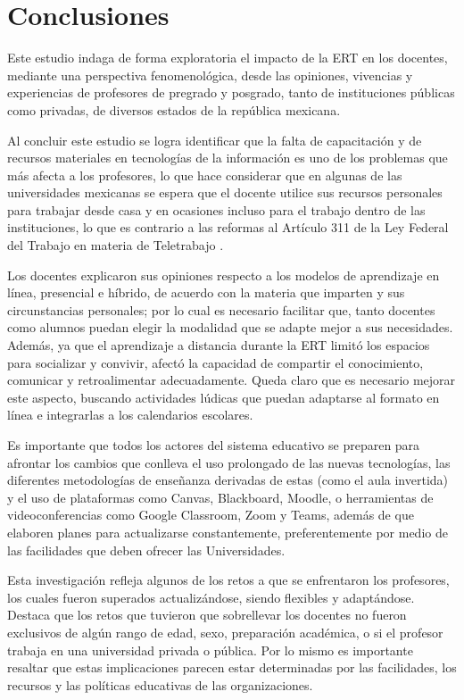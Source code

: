 \documentclass[spanish]{textolivre}
\begin{document}
\section{Conclusiones}

Este estudio indaga de forma exploratoria el impacto de la ERT en los docentes, mediante una perspectiva fenomenológica, desde las opiniones, vivencias y experiencias de profesores de pregrado y posgrado, tanto de instituciones públicas como privadas, de diversos estados de la república mexicana.

Al concluir este estudio se logra identificar que la falta de capacitación y de recursos materiales en tecnologías de la información es uno de los problemas que más afecta a los profesores, lo que hace considerar que en algunas de las universidades mexicanas se espera que el docente utilice sus recursos personales para trabajar desde casa y en ocasiones incluso para el trabajo dentro de las instituciones, lo que es contrario a las reformas al Artículo 311 de la Ley Federal del Trabajo en materia de Teletrabajo \cite{secretariaacuerdo21}.

Los docentes explicaron sus opiniones respecto a los modelos de aprendizaje en línea, presencial e híbrido, de acuerdo con la materia que imparten y sus circunstancias personales; por lo cual es necesario facilitar que, tanto docentes como alumnos puedan elegir la modalidad que se adapte mejor a sus necesidades. Además, ya que el aprendizaje a distancia durante la ERT limitó los espacios para socializar y convivir, afectó la capacidad de compartir el conocimiento, comunicar y retroalimentar adecuadamente. Queda claro que es necesario mejorar este aspecto, buscando actividades lúdicas que puedan adaptarse al formato en línea e integrarlas a los calendarios escolares.

Es importante que todos los actores del sistema educativo se preparen para afrontar los cambios que conlleva el uso prolongado de las nuevas tecnologías, las diferentes metodologías de enseñanza derivadas de estas (como el aula invertida) y el uso de plataformas como Canvas, Blackboard, Moodle, o herramientas de videoconferencias como Google Classroom, Zoom y Teams, además de que elaboren planes para actualizarse constantemente, preferentemente por medio de las facilidades que deben ofrecer las Universidades.

Esta investigación refleja algunos de los retos a que se enfrentaron los profesores, los cuales fueron superados actualizándose, siendo flexibles y adaptándose. Destaca que los retos que tuvieron que sobrellevar los docentes no fueron exclusivos de algún rango de edad, sexo, preparación académica, o si el profesor trabaja en una universidad privada o pública. Por lo mismo es importante resaltar que estas implicaciones parecen estar determinadas por las facilidades, los recursos y las políticas educativas de las organizaciones.
\end{document}
